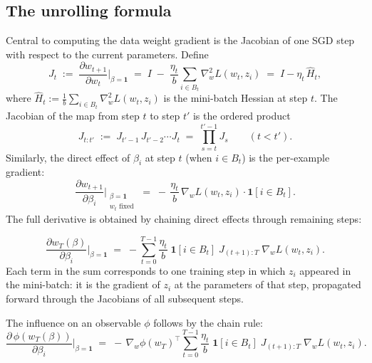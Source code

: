 \documentclass[11pt]{article}
\begin{document}
\subsection{The unrolling formula}\label{subsec:unroll-formula}

Central to computing the data weight gradient is the Jacobian of one SGD step with respect to the current parameters. Define
\begin{equation}\label{eq:step-jacobian}
  J_t \;:=\; \frac{\partial w_{t+1}}{\partial w_t}\bigg\rvert_{\beta=\mathbf{1}} \;=\; I \;-\; \frac{\eta_t}{b}\sum_{i\in B_t}\nabla_w^2 L(w_t,z_i) \;=\; I - \eta_t\,\widehat{H}_t,
\end{equation}
where $\widehat{H}_t := \tfrac{1}{b}\sum_{i\in B_t}\nabla_w^2 L(w_t,z_i)$ is the mini-batch Hessian at step $t$. The Jacobian of the map from step $t$ to step $t'$ is the ordered product
\begin{equation}\label{eq:chained-jacobian}
  J_{t:t'} \;:=\; J_{t'-1}\,J_{t'-2}\cdots J_{t} \;=\; \prod_{s=t}^{t'-1} J_s \qquad (t < t').
\end{equation}
Similarly, the direct effect of $\beta_i$ at step $t$ (when $i\in B_t$) is the per-example gradient:
\begin{equation}\label{eq:direct-effect}
  \frac{\partial w_{t+1}}{\partial \beta_i}\bigg\rvert_{\substack{\beta=\mathbf{1}\\w_t\text{ fixed}}} \;=\; -\,\frac{\eta_t}{b}\,\nabla_w L(w_t,z_i) \cdot \mathbf{1}[i\in B_t].
\end{equation}
The full derivative is obtained by chaining direct effects through remaining steps:

\begin{equation}\label{eq:unroll-formula}
  \boxed{\;\frac{\partial w_T(\beta)}{\partial \beta_i}\bigg\rvert_{\beta=\mathbf{1}} \;=\; -\sum_{t=0}^{T-1}\frac{\eta_t}{b}\;\mathbf{1}[i\in B_t]\;J_{(t+1):T}\;\nabla_w L(w_t,z_i).\;}
\end{equation}
Each term in the sum corresponds to one training step in which $z_i$ appeared in the mini-batch: it is the gradient of $z_i$ at the parameters of that step, propagated forward through the Jacobians of all subsequent steps.

The influence on an observable $\phi$ follows by the chain rule:
\begin{equation}\label{eq:unroll-influence}
  \frac{\partial\,\phi(w_T(\beta))}{\partial \beta_i}\bigg\rvert_{\beta=\mathbf{1}} \;=\; -\,\nabla_w\phi(w_T)^\top\sum_{t=0}^{T-1}\frac{\eta_t}{b}\;\mathbf{1}[i\in B_t]\;J_{(t+1):T}\;\nabla_w L(w_t,z_i).
\end{equation}
\end{document}
